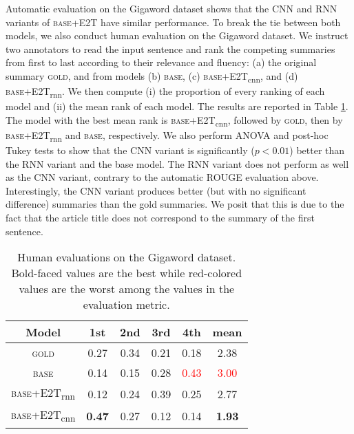 \documentclass[11pt,a4paper]{article}
\begin{document}
Automatic evaluation on the Gigaword dataset shows that the CNN and RNN variants of \textsc{base}+E2T have similar performance.
To break the tie between both models, we also conduct human evaluation on the Gigaword dataset. We instruct two annotators to read the input sentence and rank the competing summaries from first to last according to their relevance and fluency: 
(a) the original summary \textsc{gold}, and
from models (b) \textsc{base}, (c) \textsc{base}+E2T\textsubscript{cnn}, and (d) \textsc{base}+E2T\textsubscript{rnn}. We then compute (i) the proportion of every ranking of each model and (ii) the mean rank of each model. The results are reported in Table \ref{tab:human}.
The model with the best mean rank is \textsc{base}+E2T\textsubscript{cnn}, followed by \textsc{gold}, then by \textsc{base}+E2T\textsubscript{rnn} and \textsc{base}, respectively.
We also perform ANOVA and post-hoc Tukey tests to show that the CNN variant is significantly ($p<0.01$) better than the RNN variant and the base model.
The RNN variant does not perform as well as the CNN variant, contrary to the automatic ROUGE evaluation above.
Interestingly, the CNN variant produces better (but with no significant difference) summaries than the gold summaries. We posit that this is due to the fact that the article title does not correspond to the summary of the first sentence.

\begin{table}
    \small
    \centering
    \begin{tabular}{|c|cccc|c|}
        \hline
        Model & 1st & 2nd & 3rd & 4th & mean \\ \hline
        \textsc{gold} & 0.27 & 0.34 & 0.21 & 0.18 & 2.38 \\ 
        \textsc{base} & 0.14 & 0.15 & 0.28 & \textcolor{red}{0.43} & \textcolor{red}{3.00} \\ 
        \textsc{base}+E2T\textsubscript{rnn} & {0.12} & 0.24 & 0.39 & 0.25 & 2.77 \\ 
        \textsc{base}+E2T\textsubscript{cnn} & \textbf{0.47} & 0.27 & 0.12 & 0.14 & \textbf{1.93} \\ \hline
    \end{tabular}
    \caption{Human evaluations on the Gigaword dataset. Bold-faced values are the best while red-colored values are the worst among the values in the evaluation metric.}
    \label{tab:human}
\end{table}
\end{document}
